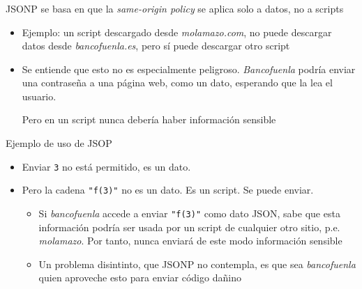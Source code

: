 \documentclass[ucs]{beamer}
\begin{document}
\begin{frame}[fragile]
\frametitle{}
JSONP
se basa en que la
\emph{same-origin policy}
se aplica solo a datos, no a scripts

\begin{itemize}
    \item
Ejemplo:
un script descargado desde
\emph{molamazo.com},
no puede
descargar datos
desde
\emph{bancofuenla.es},
pero sí puede descargar otro script

    \item
Se entiende que esto no es especialmente peligroso.
\emph{Bancofuenla}
podría enviar una contraseña a una página web, como un dato,  esperando que la lea el usuario.

Pero en un script nunca debería haber información sensible

    \end{itemize}

\end{frame}

\begin{frame}[fragile]


Ejemplo de uso de JSOP

\begin{itemize}
    \item
Enviar \verb|3| no está permitido, es un dato.

    \item
Pero la cadena \verb|"f(3)"| no es un dato. Es un script.
Se puede enviar.


    \begin{itemize}
    \item
Si
\emph{bancofuenla}
accede a enviar
\verb|"f(3)"|
como dato JSON, sabe que esta información podría ser usada por un script de
cualquier otro sitio, p.e.
\emph{molamazo}. Por tanto, nunca enviará de este modo información sensible

    \item
Un problema disintinto, que JSONP no contempla, es que sea
\emph{bancofuenla}
quien aproveche esto para enviar código dañino
    \end{itemize}
    \end{itemize}


\end{frame}
\end{document}
